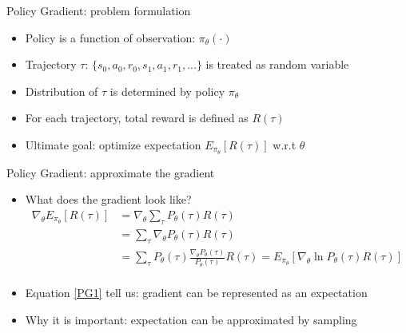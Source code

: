\begin{frame}{Policy Gradient: problem formulation}
    \begin{itemize}
        \item Policy is a function of observation: $\pi_{\theta}(\cdot)$\\\vspace{0.2cm}
        \item Trajectory $\tau$: $\{s_0,a_0,r_0,s_1,a_1,r_1,...\}$ is treated as random variable\\\vspace{0.2cm}
        \item Distribution of $\tau$ is determined by policy $\pi_{\theta}$\\\vspace{0.2cm}
        \item For each trajectory, total reward is defined as $R(\tau)$\\\vspace{0.2cm}
        \item Ultimate goal: optimize expectation $E_{\pi_{\theta}}[R(\tau)]$ w.r.t $\theta$\\\vspace{0.2cm}
    \end{itemize}
\end{frame}

\begin{frame}{Policy Gradient: approximate the gradient}
    \begin{itemize}
        \item What does the gradient look like?
        \begin{equation}
            \label{PG1}
            \begin{split}
            \nabla_\theta E_{\pi_{\theta}}[R(\tau)] &= \nabla_\theta \sum\limits_{\tau} P_\theta(\tau)R(\tau)\\ 
                                                &= \sum\limits_{\tau} \nabla_\theta P_\theta(\tau)R(\tau)\\
                                                &= \sum\limits_{\tau} P_\theta(\tau) \frac{\nabla_\theta P_\theta(\tau)}{P_\theta(\tau)} R(\tau) = E_{\pi_{\theta}}[\nabla_\theta\ln P_\theta(\tau)R(\tau)]\\
            \end{split}
        \end{equation}
        \item Equation \ref{PG1} tell us: gradient can be represented as an expectation\\\vspace{0.2cm}
        \item Why it is important: expectation can be approximated by sampling\\\vspace{0.2cm}
    \end{itemize}
\end{frame}


